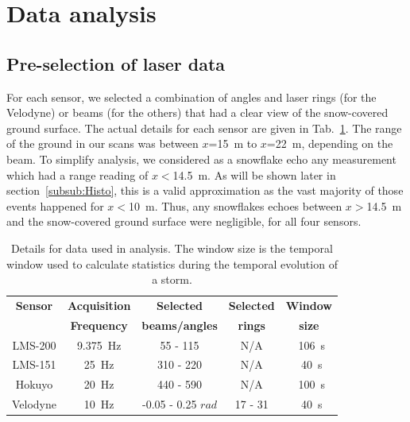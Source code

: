 \section{Data analysis}
\label{sec:data-analysis}

\subsection{Pre-selection of laser data}
For each sensor, we selected a combination of angles and laser rings (for the Velodyne) or beams (for the others) that had a clear view of the snow-covered ground surface. The actual details for each sensor are given in Tab.~\ref{tab:selectionScans}. The range of the ground in our scans was between $x$=\SI{15}{\meter} to $x$=\SI{22}{\meter}, depending on the beam. To simplify analysis, we considered as a snowflake echo any measurement which had a range reading of $x<$\SI{14.5}{\meter}. As will be shown later in section~\ref{subsub:Histo}, this is a valid approximation as the vast majority of those events happened for $x<$\SI{10}{\meter}. Thus, any snowflakes echoes between  $x>$\SI{14.5}{\meter} and the snow-covered ground surface were negligible, for all four sensors.

\begin{table}[htbp]
    \centering
    \begin{tabular}{|c|c|c|c|c|}
        \hline
        \textbf{Sensor}            & \textbf{Acquisition}  & \textbf{Selected}  & \textbf{Selected}  & \textbf{Window} \\
        \textbf{ }                     & \textbf{Frequency}  & \textbf{beams/angles}  & \textbf{rings}  & \textbf{size} \\\hline
       LMS-200               & \SI{9.375}{\Hz}                      & 55 - 115                                    & N/A                         & ~\SI{106}{\second}       \\\hline
        LMS-151               & \SI{25}{\Hz}                           & 310 - 220                                  & N/A                         & ~\SI{40}{\second}        \\\hline
        Hokuyo               & \SI{20}{\Hz}                          & 440 - 590                                  & N/A                         & ~\SI{100}{\second}     \\\hline
        Velodyne             & \SI{10}{\Hz}                          & -0.05 - 0.25 $rad$                     & 17 - 31                   & ~\SI{40}{\second}      \\\hline
    \end{tabular}
    \caption{Details for data used in analysis. The window size is the temporal window used to calculate statistics during the temporal evolution of a storm.}
    \label{tab:selectionScans}
\end{table}

